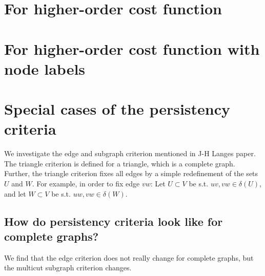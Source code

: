 \section{For higher-order cost function}

\section{For higher-order cost function with node labels}


\section{Special cases of the persistency criteria}
We investigate the edge and subgraph criterion mentioned in J-H Langes paper. The triangle criterion is defined for a triangle, which is a complete graph. 
Further, the triangle criterion fixes all edges by a simple redefinement of the sets $U$ and $W$. For example, in order to fix edge $vw$: Let $U \subset V$ be s.t. $uv, vw \in \delta(U)$, and let $W \subset V$ be s.t. $uw, vw \in \delta(W)$. 
\subsection{How do persistency criteria look like for complete graphs?}
We find that the edge criterion does not really change for complete graphs, but the multicut subgraph criterion changes. 

